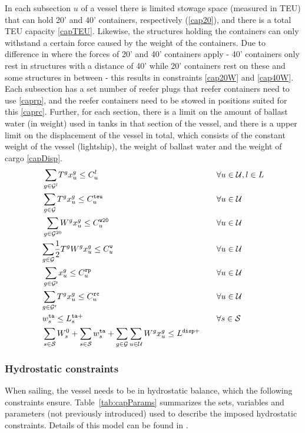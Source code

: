 In each subsection $u$ of a vessel there is limited stowage space (measured in TEU) that can hold 20' and 40' containers, respectively (\ref{cap20}), and there is a total TEU capacity \eqref{capTEU}. Likewise, the structures holding the containers can only withstand a certain force caused by the weight of the containers. Due to difference in where the forces of 20' and 40' containers apply - 40' containers only rest in structures with a distance of 40' while 20' containers rest on these and some structures in between - this results in constraints \eqref{cap20W} and \eqref{cap40W}.
Each subsection has a set number of reefer plugs that reefer containers need to use \eqref{caprp}, and the reefer containers need to be stowed in positions suited for this \eqref{caprc}.
Further, for each section, there is a limit on the amount of ballast water (in weight) used in tanks in that section of the vessel, and there is a upper limit on the displacement of the vessel in total, which consists of the constant weight of the vessel (lightship), the weight of ballast water and the weight of cargo \eqref{capDisp}.
\begin{alignat}{4}
&	\so[r]{\sum_{g\in \mc{G}^{l}}}T^gx^{g}_{u}\leq C^{l}_{u}   					&& \forall u\in \mc{U}, l\in L\label{cap20}\\
&	\so[r]{\sum_{g\in \mc{G}}}T^gx^{g}_{u} \leq C^\ttt{teu}_{u} 				&& \forall u\in \mc{U}\label{capTEU}\\
&	\so[r]{\sum_{g\in \mc{G}^{20}}}W^gx^{g}_{u}\leq C^\ttt{w20}_{u}    	&& \forall u\in \mc{U}\label{cap20W}\\
&	{\sum_{g\in \mc{G}}}\frac{1}{2}T^gW^gx^{g}_{u} \leq C^\ttt{w}_{u}		&& \forall u\in \mc{U}\label{cap40W}\\
&	\so[r]{\sum_{g\in \mc{G}^\ttt{r}}}x^{g}_{u}\leq C^\ttt{rp}_{u}			&& \forall u\in \mc{U}\label{caprp}\\
&	{\sum_{g\in \mc{G}^\ttt{r}}}T^gx^{g}_{u} \leq C^\ttt{rc}_{u} 				&& \forall u\in \mc{U}\label{caprc}\\
& w^{\ttt{ta}}_s \leq L^{\ttt{ta}+}_s																	&& \forall s\in \mc{S}\label{capballast}\\
& \sum_{s\in\mc{S}}W^0_s + \sum_{s\in\mc{S}} w^\ttt{ta}_s + \sum_{g\in \mc{G}}\sum_{u\in\mc{U}}W^g x^g_u\leq L^{\ttt{disp}+}\quad \label{capDisp}
\end{alignat}

\subsubsection{Hydrostatic constraints}
When sailing, the vessel needs to be in hydrostatic balance, which the following constraints ensure. Table~\ref{tab:capParams} summarizes the sets, variables and parameters (not previously introduced) used to describe the imposed hydrostatic constraints. Details of this model can be found in \cite{iccl18}.

